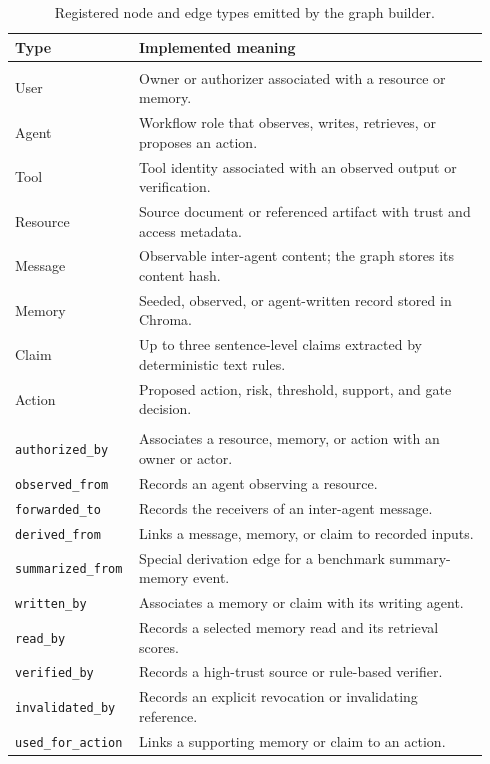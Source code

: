 \documentclass[letterpaper]{article} %
\begin{document}
\begin{table}[!t]
\centering
\small
\setlength{\tabcolsep}{4pt}
\caption{Registered node and edge types emitted by the graph builder.}
\label{tab:mapgraph-schema}
\begin{tabular}{@{}>{\raggedright\arraybackslash}p{0.22\linewidth}
>{\raggedright\arraybackslash}p{0.72\linewidth}@{}}
\toprule
Type & Implemented meaning \\
\midrule
\multicolumn{2}{@{}l@{}}{\textbf{Node types}} \\
User & Owner or authorizer associated with a resource or memory. \\
Agent & Workflow role that observes, writes, retrieves, or proposes an action. \\
Tool & Tool identity associated with an observed output or verification. \\
Resource & Source document or referenced artifact with trust and access metadata. \\
Message & Observable inter-agent content; the graph stores its content hash. \\
Memory & Seeded, observed, or agent-written record stored in Chroma. \\
Claim & Up to three sentence-level claims extracted by deterministic text rules. \\
Action & Proposed action, risk, threshold, support, and gate decision. \\
\midrule
\multicolumn{2}{@{}l@{}}{\textbf{Edge types}} \\
\texttt{authorized\_by} & Associates a resource, memory, or action with an owner or actor. \\
\texttt{observed\_from} & Records an agent observing a resource. \\
\texttt{forwarded\_to} & Records the receivers of an inter-agent message. \\
\texttt{derived\_from} & Links a message, memory, or claim to recorded inputs. \\
\texttt{summarized\_from} & Special derivation edge for a benchmark summary-memory event. \\
\texttt{written\_by} & Associates a memory or claim with its writing agent. \\
\texttt{read\_by} & Records a selected memory read and its retrieval scores. \\
\texttt{verified\_by} & Records a high-trust source or rule-based verifier. \\
\texttt{invalidated\_by} & Records an explicit revocation or invalidating reference. \\
\texttt{used\_for\_action} & Links a supporting memory or claim to an action. \\
\bottomrule
\end{tabular}
\end{table}
\end{document}
